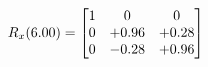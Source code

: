 \documentclass[preview]{standalone}
\begin{document}
\begin{align*}
\special{dvisvgm:raw <g id='unique000'>}R_{x}(6.00) = \begin{bmatrix}1 & 0 & 0 \\0 & +0.96 & +0.28 \\0 & -0.28 & +0.96\end{bmatrix}\special{dvisvgm:raw </g>}
\end{align*}
\end{document}

